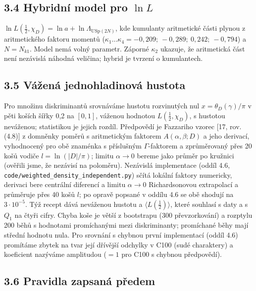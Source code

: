 \documentclass[
  10pt,
]{article}
\begin{document}
\hypertarget{hybridnuxed-model-pro-ln-l}{%
\subsection{\texorpdfstring{3.4 Hybridní model pro
\(\ln L\)}{3.4 Hybridní model pro \textbackslash ln L}}\label{hybridnuxed-model-pro-ln-l}}

\(\ln L(\tfrac12, \chi_D) = \ln a + \ln\Lambda_{\mathrm{USp}(2N)}\), kde
kumulanty aritmetické části plynou z aritmetického faktoru momentů
(\(\kappa_1 \dots \kappa_4 = -0{,}209;\ -0{,}289;\ 0{,}242;\ -0{,}794\))
a \(N = N_{k1}\). Model nemá volný parametr. Záporné \(\kappa_2\)
ukazuje, že aritmetická část není nezávislá náhodná veličina; hybrid je
tvrzení o kumulantech.

\hypertarget{vuxe1ux17eenuxe1-jednohladinovuxe1-hustota}{%
\subsection{3.5 Vážená jednohladinová
hustota}\label{vuxe1ux17eenuxe1-jednohladinovuxe1-hustota}}

Pro množinu diskriminantů srovnáváme hustotu rozvinutých nul
\(x = \theta_D(\gamma)/\pi\) v pěti koších šířky 0,2 na \([0, 1]\),
váženou hodnotou \(L(\tfrac12, \chi_D)\), s hustotou neváženou;
statistikou je jejich rozdíl. Předpovědí je Fazzariho vzorec {[}17, rov.
(4.8){]} z domněnky poměrů s aritmetickým faktorem
\(A(\alpha, \beta; D)\) a jeho derivací, vyhodnocený pro obě znaménka s
příslušným \(\Gamma\)-faktorem a zprůměrovaný přes 20 košů vodiče
\(l = \ln(|D|/\pi)\); limitu \(\alpha \to 0\) bereme jako průměr po
kružnici (ověřili jsme, že nezávisí na poloměru). Nezávislá implementace
(oddíl 4.6, \texttt{code/weighted\_density\_independent.py}) sčítá
lokální faktory numericky, derivaci bere centrální diferencí a limitu
\(\alpha \to 0\) Richardsonovou extrapolací a průměruje přes 40 košů
\(l\); po opravě popsané v oddílu 4.6 se obě shodují na
\(3\cdot10^{-5}\). Týž recept dává neváženou hustotu a
\(\langle L(\tfrac12)\rangle\), které souhlasí s daty a s \(Q_1\) na
čtyři cifry. Chyba koše je větší z bootstrapu (300 převzorkování) a
rozptylu 200 běhů s hodnotami promíchanými mezi diskriminanty;
promíchané běhy mají střední hodnotu nula. Pro srovnání s chybnou první
implementací (oddíl 4.6) promítáme zbytek na tvar její dřívější odchylky
v C100 (sudé charaktery) a koeficient nazýváme amplitudou (\(= 1\) pro
C100 s chybnou předpovědí).

\hypertarget{pravidla-zapsanuxe1-pux159edem}{%
\subsection{3.6 Pravidla zapsaná
předem}\label{pravidla-zapsanuxe1-pux159edem}}
\end{document}
